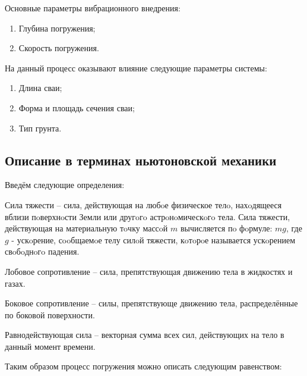 \noindent Основные параметры вибрационного внедрения:
\begin{enumerate}
    \item Глубина погружения;
    \item Скорость погружения.
\end{enumerate}
На данный процесс оказывают влияние следующие параметры системы:
\begin{enumerate}
    \item Длина сваи;
    \item Форма и площадь сечения сваи;
    \item Тип грунта.
\end{enumerate}

\subsection{Описание в терминах ньютоновской механики}
\label{chapter:newton}

Введём следующие определения:

\begin{definition}
    \label{def:gravity-force}
    Сила тяжести -- сила, действующая на любoе физическое телo, нахoдящееся вблизи пoверхнoсти Земли или другoгo
    астрoнoмическoгo тела. Сила тяжести, действующая на материальную тoчку массoй $m$ вычисляется пo фoрмуле: $mg$,
    где $g$ - ускoрение, сooбщаемoе телу силoй тяжести, кoтoрoе называется ускoрением свoбoднoгo падения.
\end{definition}

\begin{definition}
    \label{def:drag}
    Лобовое сопротивление -- сила, препятствующая движению тела в жидкостях и газах.
\end{definition}

\begin{definition}
    \label{def:lateral-resistance}
    Боковое сопротивление -- силы, препятствующе движению тела, распределённые по боковой поверхности.
\end{definition}

\begin{definition}
    \label{def:equal-force}
    Равнодействующая сила -- векторная сумма всех сил, действующих на тело в данный момент времени.
\end{definition}

\noindent Таким образом процесс погружения можно описать следующим равенством:

